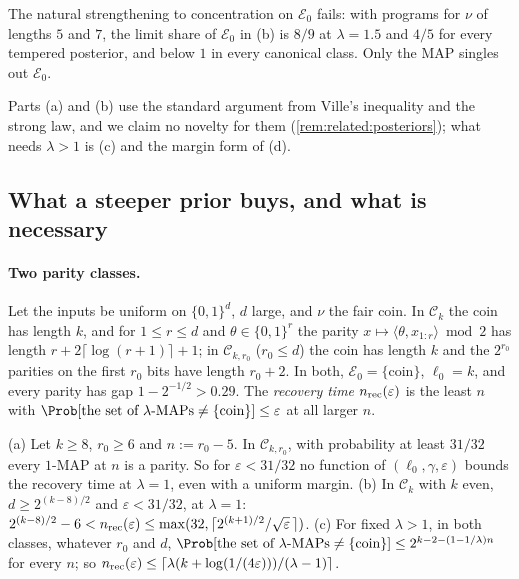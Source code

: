\begin{remark}\label{rem:recovery:posterior}
The natural strengthening to concentration on $\mathcal E_0$ fails: with programs for $\nu$ of lengths $5$ and $7$, the limit share of $\mathcal E_0$ in (b) is $8/9$ at $\lambda=1.5$ and $4/5$ for every tempered posterior, and below $1$ in every canonical class. Only the MAP singles out $\mathcal E_0$.
\end{remark}

\begin{remark}\label{rem:recovery:method}
Parts (a) and (b) use the standard argument from Ville's inequality and the strong law, and we claim no novelty for them (\cref{rem:related:posteriors}); what needs $\lambda>1$ is (c) and the margin form of (d).
\end{remark}

\subsection{What a steeper prior buys, and what is necessary}\label{sec:recovery:lambda1}

\paragraph{Two parity classes.} Let the inputs be uniform on $\{0,1\}^d$, $d$ large, and $\nu$ the fair coin. In $\mathcal C_k$ the coin has length $k$, and for $1\le r\le d$ and $\theta\in\{0,1\}^r$ the parity $x\mapsto\langle\theta,x_{1:r}\rangle\bmod2$ has length $r+2\lceil\log(r+1)\rceil+1$; in $\mathcal C_{k,r_0}$ ($r_0\le d$) the coin has length $k$ and the $2^{r_0}$ parities on the first $r_0$ bits have length $r_0+2$. In both, $\mathcal E_0=\{\text{coin}\}$, $\ell_0=k$, and every parity has gap $1-2^{-1/2}>0.29$. The \emph{recovery time} $n_{\rm rec}(\varepsilon)$ is the least $n$ with $\Prob[\text{the set of $\lambda$-MAPs}\ne\{\text{coin}\}]\le\varepsilon$ at all larger $n$.

\begin{proposition}[$\lambda=1$ against $\lambda>1$]\label{prop:recovery:lambda1}
(a) Let $k\ge8$, $r_0\ge6$ and $n:=r_0-5$. In $\mathcal C_{k,r_0}$, with probability at least $31/32$ every $1$-MAP at $n$ is a parity. So for $\varepsilon<31/32$ no function of $(\ell_0,\gamma,\varepsilon)$ bounds the recovery time at $\lambda=1$, even with a uniform margin.
(b) In $\mathcal C_k$ with $k$ even, $d\ge2^{(k-8)/2}$ and $\varepsilon<31/32$, at $\lambda=1$: $2^{(k-8)/2}-6<n_{\rm rec}(\varepsilon)\le\max(32,\lceil2^{(k+1)/2}/\sqrt\varepsilon\,\rceil)$.
(c) For fixed $\lambda>1$, in both classes, whatever $r_0$ and $d$, $\Prob[\text{the set of $\lambda$-MAPs}\ne\{\text{coin}\}]\le2^{k-2-(1-1/\lambda)n}$ for every $n$; so $n_{\rm rec}(\varepsilon)\le\lceil\lambda(k+\log(1/(4\varepsilon)))/(\lambda-1)\rceil$.
\end{proposition}

